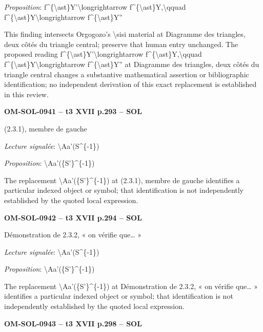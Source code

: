 \emph{Proposition}: f\textasciicircum{}\{\textbackslash{}ast\}Y'\textbackslash{}longrightarrow f\textasciicircum{}\{\textbackslash{}ast\}Y,\textbackslash{}qquad f\textasciicircum{}\{\textbackslash{}ast\}Y\textbackslash{}longrightarrow f\textasciicircum{}\{\textbackslash{}ast\}Y''\par
This finding intersects Orgogozo's \textbackslash{}sisi material at Diagramme des triangles, deux côtés du triangle central; preserve that human entry unchanged. The proposed reading f\textasciicircum{}\{\textbackslash{}ast\}Y'\textbackslash{}longrightarrow f\textasciicircum{}\{\textbackslash{}ast\}Y,\textbackslash{}qquad f\textasciicircum{}\{\textbackslash{}ast\}Y\textbackslash{}longrightarrow f\textasciicircum{}\{\textbackslash{}ast\}Y'' at Diagramme des triangles, deux côtés du triangle central changes a substantive mathematical assertion or bibliographic identification; no independent derivation of this exact replacement is established in this review.\par
\par\noindent\textbf{OM-SOL-0941 -- t3 XVII p.293 -- SOL}\par
(2.3.1), membre de gauche\par
\emph{Lecture signalée}: \textbackslash{}Aa'(S\textasciicircum{}\{-1\})\par
\emph{Proposition}: \textbackslash{}Aa'(\{S'\}\textasciicircum{}\{-1\})\par
The replacement \textbackslash{}Aa'(\{S'\}\textasciicircum{}\{-1\}) at (2.3.1), membre de gauche identifies a particular indexed object or symbol; that identification is not independently established by the quoted local expression.\par
\par\noindent\textbf{OM-SOL-0942 -- t3 XVII p.294 -- SOL}\par
Démonstration de 2.3.2, « on vérifie que… »\par
\emph{Lecture signalée}: \textbackslash{}Aa'(S\textasciicircum{}\{-1\})\par
\emph{Proposition}: \textbackslash{}Aa'(\{S'\}\textasciicircum{}\{-1\})\par
The replacement \textbackslash{}Aa'(\{S'\}\textasciicircum{}\{-1\}) at Démonstration de 2.3.2, « on vérifie que… » identifies a particular indexed object or symbol; that identification is not independently established by the quoted local expression.\par
\par\noindent\textbf{OM-SOL-0943 -- t3 XVII p.298 -- SOL}\par
